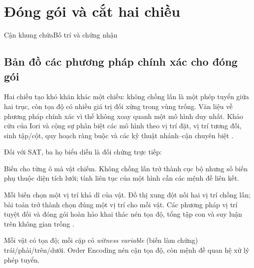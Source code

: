 \chapter{Đóng gói và cắt hai chiều}


  {Cận khung chứa}{Bố trí và chứng nhận}

\section{Bản đồ các phương pháp chính xác cho đóng gói}

Hai chiều tạo khó khăn khác một chiều: không chồng lấn là một phép tuyển giữa
hai trục, còn tọa độ có nhiều giá trị đối xứng trong vùng trống. Văn liệu về
phương pháp chính xác vì thế không xoay quanh một mô hình duy nhất. Khảo cứu
của Iori và cộng sự phân biệt các mô hình theo vị trí đặt, vị trí tương đối,
sinh tập/cột, quy hoạch ràng buộc và các kỹ thuật nhánh--cận chuyên biệt
\parencite{iori2021packing}.

Đối với SAT, ba họ biểu diễn là đối chứng trực tiếp:
\begin{description}[style=nextline]
  \item[Chiếm chỗ]
  Biến cho từng ô mà vật chiếm. Không chồng lấn trở thành cục bộ nhưng số biến
  phụ thuộc diện tích lưới; tính liên tục của một hình cần các mệnh đề liên kết.

  \item[Vị trí đặt tuyệt đối]
  Mỗi biến chọn một vị trí khả dĩ của vật. Đồ thị xung đột nối hai vị trí chồng
  lấn; bài toán trở thành chọn đúng một vị trí cho mỗi vật. Các phương pháp vị
  trí tuyệt đối và đóng gói hoàn hảo khai thác nén tọa độ, tổng tập con và suy
  luận trên không gian trống
  \parencite{huang2013rectangle}.

  \item[Vị trí tương đối + tọa độ]
  Mỗi vật có tọa độ; mỗi cặp có \emph{witness variable} (biến làm chứng)
  trái/phải/trên/dưới. Order Encoding
  nén cận tọa độ, còn mệnh đề quan hệ xử lý phép tuyển.
\end{description}


